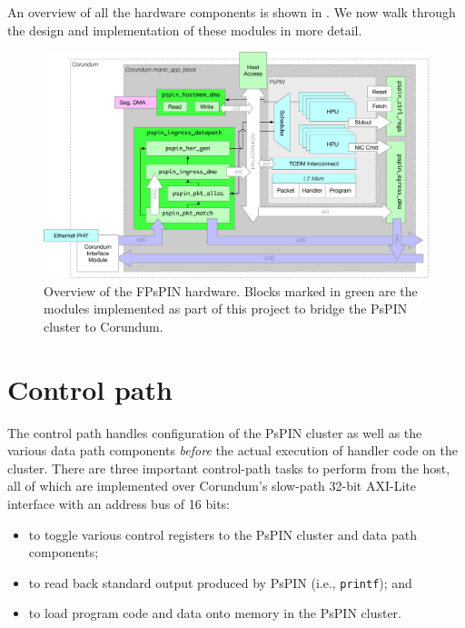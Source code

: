 An overview of all the hardware components is shown in .  We now walk through the design and implementation of these modules in more detail.

\begin{figure}
    \centering
    \includegraphics[width=\linewidth]{figures/hw-overview.pdf}
    \caption{Overview of the FPsPIN hardware.  Blocks marked in green are the modules implemented as part of this project to bridge the PsPIN cluster to Corundum.}
    \label{fig:hw-overview}
\end{figure}


\section{Control path}

The control path handles configuration of the PsPIN cluster as well as the various data path components \emph{before} the actual execution of handler code on the cluster.  There are three important control-path tasks to perform from the host, all of which are implemented over Corundum's slow-path 32-bit AXI-Lite
interface with an address bus of 16 bits:

\begin{itemize}
    \item to toggle various control registers to the PsPIN cluster and data path components;
    \item to read back standard output produced by PsPIN (i.e., \texttt{printf}); and
    \item to load program code and data onto memory in the PsPIN cluster.
\end{itemize}

